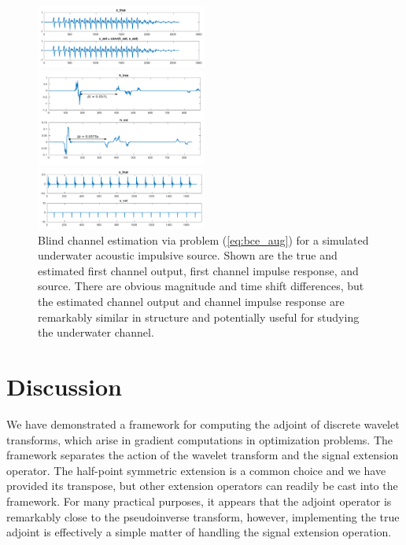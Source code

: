 \documentclass[journal]{IEEEtran}
\begin{document}
\begin{figure}
   \centering
   \includegraphics[width=0.5\textwidth]{figures/bce_rec_004_x_trim.pdf}
   
   \includegraphics[width=0.5\textwidth]{figures/bce_rec_004_h_trim_annotated.pdf}
   
   \includegraphics[width=0.5\textwidth]{figures/bce_rec_004_s_trim.pdf}
   \caption{Blind channel estimation via problem (\ref{eq:bce_aug}) for a simulated underwater acoustic impulsive source.  Shown are the true and estimated first channel output, first channel impulse response, and source.  There are obvious magnitude and time shift differences, but the estimated channel output and channel impulse response are remarkably similar in structure and potentially useful for studying the underwater channel.}
   \label{fig:bce_rec}
\end{figure}



\section{Discussion}
We have demonstrated a framework for computing the adjoint of discrete wavelet transforms, which arise in gradient computations in optimization problems.  The framework separates the action of the wavelet transform and the signal extension operator.  The half-point symmetric extension is a common choice and we have provided its transpose, but other extension operators can readily be cast into the framework.  For many practical purposes, it appears that the adjoint operator is remarkably close to the pseudoinverse transform, however, implementing the true adjoint is effectively a simple matter of handling the signal extension operation.
\end{document}
